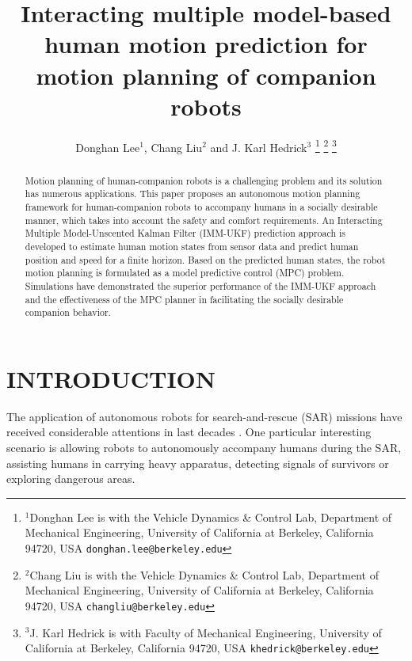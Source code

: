 \documentclass[letterpaper, 10 pt, conference]{ieeeconf}
\title{\LARGE \bf
	Interacting multiple model-based human motion prediction for\\ motion planning of companion robots
}
\author{Donghan Lee$^{1}$, Chang Liu$^{2}$ and J. Karl Hedrick$^{3}$%
	\thanks{$^{1}$Donghan Lee is with the Vehicle Dynamics \& Control Lab, Department of Mechanical Engineering, University of California at Berkeley, California 94720, USA
		{\tt\small donghan.lee@berkeley.edu}}%
	\thanks{$^{2}$Chang Liu is with the Vehicle Dynamics \& Control Lab, Department of Mechanical Engineering, University of California at Berkeley, California 94720, USA
		{\tt\small changliu@berkeley.edu}}%
	\thanks{$^{3}$J. Karl Hedrick is with Faculty of Mechanical Engineering, University of California at Berkeley, California 94720, USA
		{\tt\small khedrick@berkeley.edu}}%
}
\begin{document}
	
	\maketitle
	\thispagestyle{empty}
	\pagestyle{empty}
	
	\begin{abstract}
		Motion planning of human-companion robots is a challenging problem and its solution has numerous applications.
		This paper proposes an autonomous motion planning framework for human-companion robots to accompany humans in a socially desirable manner, which takes into account the safety and comfort requirements.
		An Interacting Multiple Model-Unscented Kalman Filter (IMM-UKF) prediction approach is developed to estimate human motion states from sensor data and predict human position and speed for a finite horizon.
		Based on the predicted human states, the robot motion planning is formulated as a model predictive control (MPC) problem.
		Simulations have demonstrated the superior performance of the IMM-UKF approach and the effectiveness of the MPC planner in facilitating the socially desirable companion behavior.
	\end{abstract}
	
	
	\section{INTRODUCTION} \label{sec:intro}
	The application of autonomous robots for search-and-rescue (SAR) missions have received considerable attentions in last decades \cite{casper2003human,nourbakhsh2005human,kruijff2012designing}.
	One particular interesting scenario is allowing robots to autonomously accompany humans during the SAR, assisting humans in carrying heavy apparatus, detecting signals of survivors or exploring dangerous areas.
	
\end{document}
